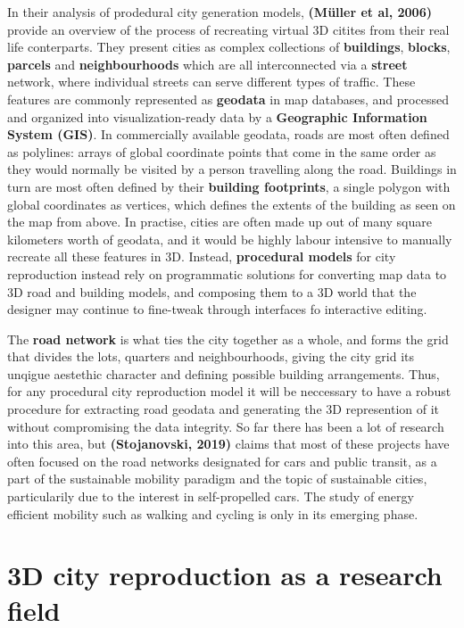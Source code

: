\documentclass{kththesis}
\begin{document}
In their analysis of prodedural city generation models, \textbf{(Müller et al, 2006)} provide an overview of the process of recreating virtual 3D citites from their real life conterparts.
They present cities as complex collections of \textbf{buildings}, \textbf{blocks}, \textbf{parcels} and \textbf{neighbourhoods} which are all interconnected via a \textbf{street} network, where individual streets can serve different types of traffic.
These features are commonly represented as \textbf{geodata} in map databases, and processed and organized into visualization-ready data by a \textbf{Geographic Information System (GIS)}.
In commercially available geodata, roads are most often defined as polylines: arrays of global coordinate points that come in the same order as they would normally be visited by a person travelling along the road. Buildings in turn are most often defined by their \textbf{building footprints}, a single polygon with global coordinates as vertices, which defines the extents of the building as seen on the map from above.
In practise, cities are often made up out of many square kilometers worth of geodata, and it would be highly labour intensive to manually recreate all these features in 3D.
Instead, \textbf{procedural models} for city reproduction instead rely on programmatic solutions for converting map data to 3D road and building models, and composing them to a 3D world that the designer may continue to fine-tweak through interfaces fo interactive editing.

The \textbf{road network} is what ties the city together as a whole, and forms the grid that divides the lots, quarters and neighbourhoods, giving the city grid its unqigue aestethic character and defining possible building arrangements.
Thus, for any procedural city reproduction model it will be neccessary to have a robust procedure for extracting road geodata and generating the 3D represention of it without compromising the data integrity. 
So far there has been a lot of research into this area, but \textbf{(Stojanovski, 2019)} claims that most of these projects have often focused on the road networks designated for cars and public transit, as a part of the sustainable mobility paradigm and the topic of sustainable cities, particularily due to the interest in self-propelled cars.
The study of energy efficient mobility such as walking and cycling is only in its emerging phase.

\section{3D city reproduction as a research field}
\end{document}
